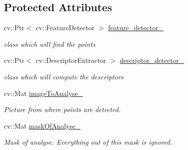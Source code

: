 \subsection*{Protected Attributes}
\begin{DoxyCompactItemize}
\item 
\hypertarget{class_opencv_sf_m_1_1_points_to_track_with_image_a22779db7344fed472cebc4a00ecef631}{
cv::Ptr$<$ cv::FeatureDetector $>$ \hyperlink{class_opencv_sf_m_1_1_points_to_track_with_image_a22779db7344fed472cebc4a00ecef631}{feature\_\-detector\_\-}}
\label{class_opencv_sf_m_1_1_points_to_track_with_image_a22779db7344fed472cebc4a00ecef631}

\begin{DoxyCompactList}\small\item\em class which will find the points \end{DoxyCompactList}\item 
\hypertarget{class_opencv_sf_m_1_1_points_to_track_with_image_ac43985b39b4b99ffff25926f1e9ece66}{
cv::Ptr$<$ cv::DescriptorExtractor $>$ \hyperlink{class_opencv_sf_m_1_1_points_to_track_with_image_ac43985b39b4b99ffff25926f1e9ece66}{descriptor\_\-detector\_\-}}
\label{class_opencv_sf_m_1_1_points_to_track_with_image_ac43985b39b4b99ffff25926f1e9ece66}

\begin{DoxyCompactList}\small\item\em class which will compute the descriptors \end{DoxyCompactList}\item 
\hypertarget{class_opencv_sf_m_1_1_points_to_track_with_image_adccc33e14b09ecbe0d5963b405e58d48}{
cv::Mat \hyperlink{class_opencv_sf_m_1_1_points_to_track_with_image_adccc33e14b09ecbe0d5963b405e58d48}{imageToAnalyse\_\-}}
\label{class_opencv_sf_m_1_1_points_to_track_with_image_adccc33e14b09ecbe0d5963b405e58d48}

\begin{DoxyCompactList}\small\item\em Picture from where points are detected. \end{DoxyCompactList}\item 
\hypertarget{class_opencv_sf_m_1_1_points_to_track_with_image_a4fe39d059ba8a892abe3a1d998626806}{
cv::Mat \hyperlink{class_opencv_sf_m_1_1_points_to_track_with_image_a4fe39d059ba8a892abe3a1d998626806}{maskOfAnalyse\_\-}}
\label{class_opencv_sf_m_1_1_points_to_track_with_image_a4fe39d059ba8a892abe3a1d998626806}

\begin{DoxyCompactList}\small\item\em Mask of analyse. Everything out of this mask is ignored. \end{DoxyCompactList}\end{DoxyCompactItemize}


